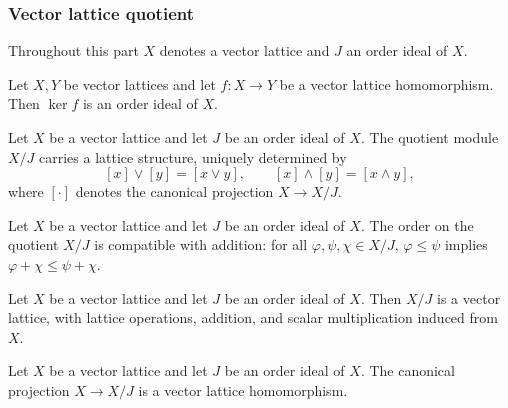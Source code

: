 \subsubsection{Vector lattice quotient}

Throughout this part $X$ denotes a vector lattice and $J$ an order
ideal of $X$.

\begin{lemma}
\label{lem:orderIdeal-ofKerVecLatHom}
\leanok
{}
Let $X, Y$ be vector lattices and let $f \colon X \to Y$ be a
vector lattice homomorphism. Then $\ker f$ is an order ideal of
$X$.
\end{lemma}

\begin{lemma}
\label{lem:orderIdeal-instQuotientLattice}
\leanok
{}
Let $X$ be a vector lattice and let $J$ be an order ideal of $X$.
The quotient module $X / J$ carries a lattice structure, uniquely
determined by
\[
  [x] \vee [y] = [x \vee y], \qquad [x] \wedge [y] = [x \wedge y],
\]
where $[\cdot]$ denotes the canonical projection $X \to X / J$.
\end{lemma}

\begin{lemma}
\label{lem:orderIdeal-instQuotientIsOrderedAddMonoid}
\leanok
{}
Let $X$ be a vector lattice and let $J$ be an order ideal of $X$.
The order on the quotient $X / J$ is compatible with addition: for
all $\varphi, \psi, \chi \in X / J$, $\varphi \le \psi$ implies
$\varphi + \chi \le \psi + \chi$.
\end{lemma}

\begin{theorem}
\label{thm:orderIdeal-instQuotientVectorLattice}
\leanok
{}
Let $X$ be a vector lattice and let $J$ be an order ideal of $X$.
Then $X / J$ is a vector lattice, with lattice operations,
addition, and scalar multiplication induced from $X$.
\end{theorem}

\begin{lemma}
\label{lem:orderIdeal-mkQVecLatHom}
\leanok
{}
Let $X$ be a vector lattice and let $J$ be an order ideal of $X$.
The canonical projection $X \to X / J$ is a vector lattice
homomorphism.
\end{lemma}

